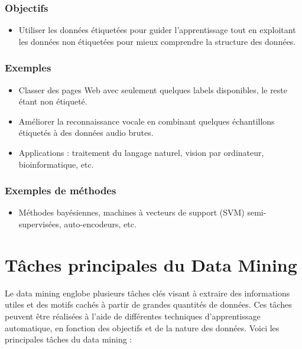 \documentclass[a4paper,12pt]{report}
\begin{document}
        \subsubsection*{Objectifs}
        
        \begin{itemize}
            \item  Utiliser les données étiquetées pour guider l’apprentissage tout en exploitant les données non étiquetées pour mieux comprendre la structure des données.
        \end{itemize}
        
        \subsubsection*{Exemples}
        
        \begin{itemize}
            \item  Classer des pages Web avec seulement quelques labels disponibles, le reste étant non étiqueté.
            \item  Améliorer la reconnaissance vocale en combinant quelques échantillons étiquetés à des données audio brutes.
            \item  Applications : traitement du langage naturel, vision par ordinateur, bioinformatique, etc.
        \end{itemize}
        
        \subsubsection*{Exemples de méthodes}
        
        \begin{itemize}
            \item Méthodes bayésiennes, machines à vecteurs de support (SVM) semi-supervisées, auto-encodeurs, etc.
        \end{itemize}
    
      \section{Tâches principales du Data Mining}
        Le data mining englobe plusieurs tâches clés visant à extraire des informations utiles et des motifs cachés à partir de grandes quantités de données. Ces tâches peuvent être réalisées à l'aide de différentes techniques d'apprentissage automatique, en fonction des objectifs et de la nature des données. Voici les principales tâches du data mining :
        
\end{document}
